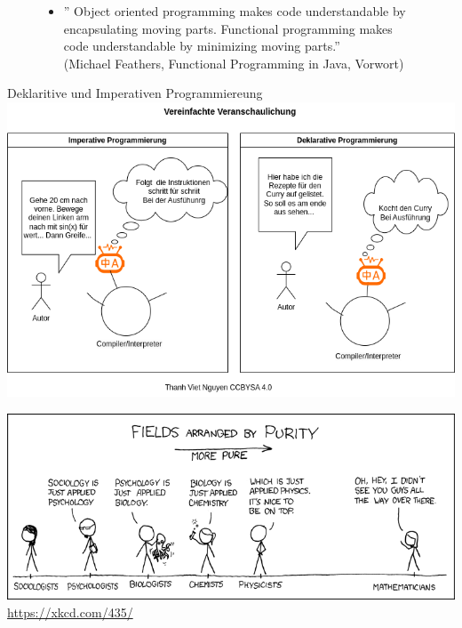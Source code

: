\documentclass{beamer}
\begin{document}
\begin{frame}
\begin{figure}
    \begin{itemize}
    \item \textmd{'' Object oriented programming makes code understandable by encapsulating moving parts.
Functional programming makes code understandable by minimizing moving parts.''  \\ 
(Michael Feathers, Functional Programming in Java, Vorwort)}
    \end{itemize}
\end{figure}
\end{frame}

\begin{frame}{Deklaritive und Imperativen Programmiereung}
\centering
\includegraphics[scale=0.38]{bilder/minicom.drawio.png} 
\end{frame}

\begin{frame}
	\centering
	\includegraphics[scale=0.35]{bilder/purity.png}
    \textmd{\url{https://xkcd.com/435/}}
\end{frame}
\end{document}
